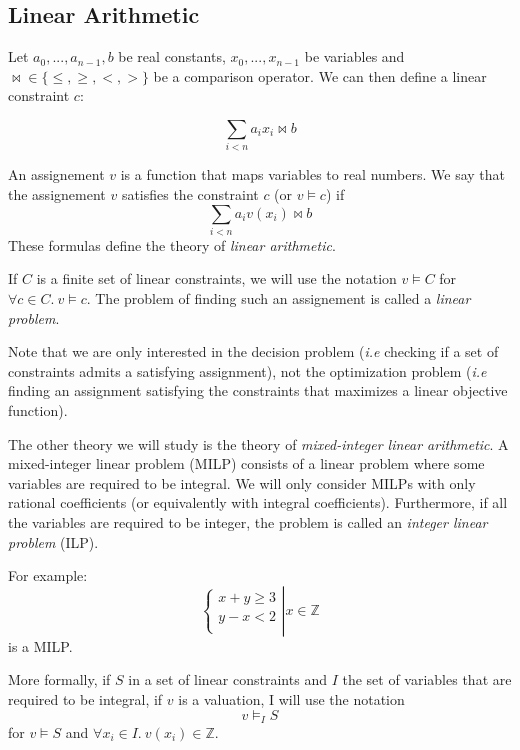 \documentclass{article}
\newcommand{\ints}{\mathbb{Z}}
\begin{document}
\subsection{Linear Arithmetic}

Let $a_0, ..., a_{n-1}, b$ be real constants, $x_0, ..., x_{n-1}$ be
variables and ${\bowtie} \in \{\leqslant,\geqslant,<,>\}$ be a comparison
operator. We can then define a linear constraint $c$:

$$\sum_{i < n} a_i x_i \bowtie b$$

An assignement $v$ is a function that maps variables to real numbers.
We say that the assignement $v$ satisfies the constraint $c$ (or $v \vDash c$)
if $$\sum_{i < n} a_i v(x_i) \bowtie b$$
These formulas define the theory of \textit{linear arithmetic}.

If $C$ is a finite set of linear constraints,
we will use the notation $v \vDash C$ for $\forall c \in C.~v \vDash c$. The
problem of finding such an assignement is called a \textit{linear problem}.

Note that we are only interested in the decision problem (\textit{i.e} checking
if a set of constraints admits a satisfying assignment), not the optimization
problem (\textit{i.e} finding an assignment satisfying the constraints that
maximizes a linear objective function). 

The other theory we will study is the theory of \textit{mixed-integer linear
arithmetic}. A mixed-integer linear problem (MILP) consists of a linear
problem where some variables are required to be integral. We will only consider
MILPs with only rational coefficients (or equivalently with integral
coefficients). Furthermore, if all the variables are required to be
integer, the problem is called an \textit{integer linear problem} (ILP).

For example:
\begin{displaymath}
  \left\{
  \begin{array}{l}
    x + y \geqslant 3 \\
    y - x < 2 \\
  \end{array}
  \right|
  x \in \ints
\end{displaymath}
is a MILP.

More formally, if $S$ in a set of linear constraints and $I$ the set of
variables that are required to be integral, if $v$ is a valuation, I will use
the notation $$v \vDash_I S$$ for $v \vDash S$ and
$\forall x_i \in I.~v(x_i) \in \ints$.
\end{document}
